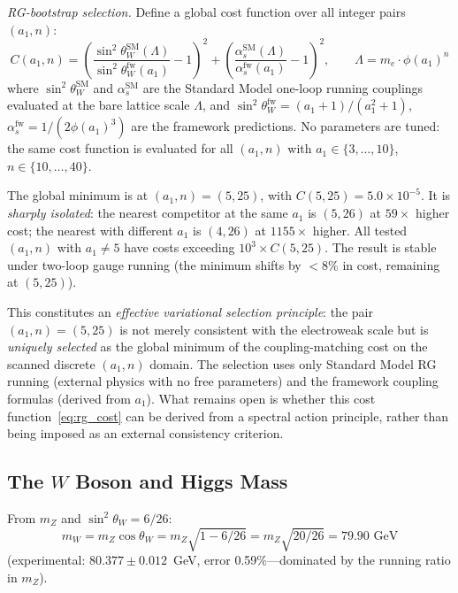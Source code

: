 \documentclass[12pt,a4paper]{article}
\theoremstyle{definition}
\begin{document}
\noindent\textit{RG-bootstrap selection.}  Define a global cost function over all integer pairs $(a_1, n)$:
\begin{equation}
C(a_1, n) = \left(\frac{\sin^2\theta_W^{\mathrm{SM}}(\Lambda)}{\sin^2\theta_W^{\mathrm{fw}}(a_1)} - 1\right)^2 + \left(\frac{\alpha_s^{\mathrm{SM}}(\Lambda)}{\alpha_s^{\mathrm{fw}}(a_1)} - 1\right)^2, \qquad \Lambda = m_e \cdot \phi(a_1)^n
\label{eq:rg_cost}
\end{equation}
where $\sin^2\theta_W^{\mathrm{SM}}$ and $\alpha_s^{\mathrm{SM}}$ are the Standard Model one-loop running couplings evaluated at the bare lattice scale $\Lambda$, and $\sin^2\theta_W^{\mathrm{fw}} = (a_1+1)/(a_1^2+1)$, $\alpha_s^{\mathrm{fw}} = 1/(2\phi(a_1)^3)$ are the framework predictions.  No parameters are tuned: the same cost function is evaluated for all $(a_1, n)$ with $a_1 \in \{3, \ldots, 10\}$, $n \in \{10, \ldots, 40\}$.

The global minimum is at $(a_1, n) = (5, 25)$, with $C(5,25) = 5.0 \times 10^{-5}$.  It is \emph{sharply isolated}: the nearest competitor at the same $a_1$ is $(5, 26)$ at $59\times$ higher cost; the nearest with different $a_1$ is $(4, 26)$ at $1155\times$ higher.  All tested $(a_1, n)$ with $a_1 \ne 5$ have costs exceeding $10^3 \times C(5,25)$.  The result is stable under two-loop gauge running (the minimum shifts by $< 8\%$ in cost, remaining at $(5,25)$).

This constitutes an \emph{effective variational selection principle}: the pair $(a_1, n) = (5, 25)$ is not merely consistent with the electroweak scale but is \emph{uniquely selected} as the global minimum of the coupling-matching cost on the scanned discrete $(a_1, n)$ domain.  The selection uses only Standard Model RG running (external physics with no free parameters) and the framework coupling formulas (derived from $a_1$).  What remains open is whether this cost function~\eqref{eq:rg_cost} can be derived from a spectral action principle, rather than being imposed as an external consistency criterion.

\subsection{The \texorpdfstring{$W$}{W} Boson and Higgs Mass}

From $m_Z$ and $\sin^2\theta_W = 6/26$:
\begin{equation}
m_W = m_Z \cos\theta_W = m_Z \sqrt{1 - 6/26} = m_Z\sqrt{20/26} = 79.90 \text{ GeV}
\end{equation}
(experimental: $80.377 \pm 0.012$~GeV, error 0.59\%---dominated by the running ratio in $m_Z$).
\end{document}
